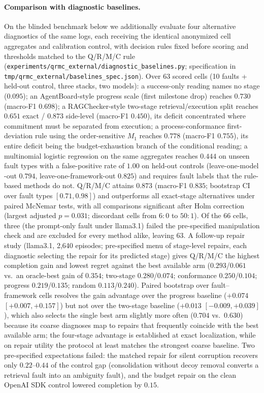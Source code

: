 \documentclass{article}
\begin{document}
\paragraph{Comparison with diagnostic baselines.} On the blinded
benchmark below we additionally evaluate four alternative diagnostics
of the same logs, each receiving the identical anonymized cell
aggregates and calibration control, with decision rules fixed before
scoring and thresholds matched to the Q/R/M/C rule
(\texttt{experiments/qrmc\_external/diagnostic\_baselines.py};
specification in \texttt{tmp/qrmc\_external/baselines\_spec.json}).
Over 63 scored cells (10 faults + held-out control, three stacks, two
models): a success-only reading names no stage ($0.095$); an
AgentBoard-style progress scale (first milestone drop) reaches
$0.730$ (macro-F1 $0.698$); a RAGChecker-style two-stage
retrieval/execution split reaches $0.651$ exact / $0.873$ side-level
(macro-F1 $0.450$), its deficit concentrated where commitment must be
separated from execution; a process-conformance first-deviation rule
using the order-sensitive $M_1$ reaches $0.778$ (macro-F1 $0.755$),
its entire deficit being the budget-exhaustion branch of the
conditional reading; a multinomial logistic regression on the same
aggregates reaches $0.444$ on unseen fault types with a
false-positive rate of $1.00$ on held-out controls (leave-one-model
-out $0.794$, leave-one-framework-out $0.825$) and requires fault
labels that the rule-based methods do not. Q/R/M/C attains $0.873$
(macro-F1 $0.835$; bootstrap CI over fault types $[0.71,0.98]$) and
outperforms all exact-stage alternatives under paired McNemar
tests, with all comparisons significant after Holm correction
(largest adjusted $p=0.031$; discordant cells from $6{:}0$ to
$50{:}1$). Of the $66$ cells, three (the prompt-only fault under
llama3.1) failed the pre-specified manipulation check and are
excluded for every method alike, leaving $63$. A
follow-up repair study (llama3.1, 2{,}640 episodes; pre-specified
menu of stage-level repairs, each diagnostic selecting the repair for
its predicted stage) gives Q/R/M/C the highest completion gain and
lowest regret against the best available arm ($0.293$/$0.061$ vs.\
an oracle-best gain of $0.354$; two-stage $0.280$/$0.074$;
conformance $0.250$/$0.104$; progress $0.219$/$0.135$; random
$0.113$/$0.240$). Paired bootstrap over fault--framework cells
resolves the gain advantage over the progress baseline
($+0.074$ $[+0.007,+0.157]$) but not over the two-stage baseline
($+0.013$ $[-0.009,+0.039]$), which also selects the single best arm
slightly more often ($0.704$ vs.\ $0.630$) because its coarse
diagnoses map to repairs that frequently coincide with the best
available arm; the four-stage advantage is established at exact
localization, while on repair utility the protocol at least matches
the strongest coarse baseline. Two pre-specified expectations failed:
the matched repair for silent corruption recovers only
$0.22$--$0.44$ of the control gap (consolidation without decoy
removal converts a retrieval fault into an ambiguity fault), and the
budget repair on the clean OpenAI SDK control lowered completion by
$0.15$.
\end{document}
